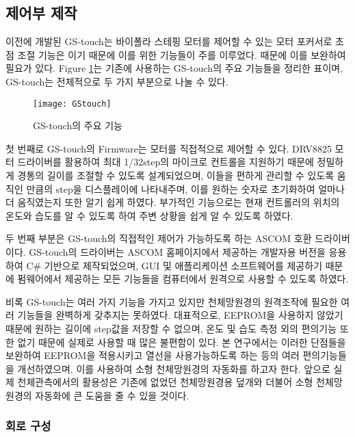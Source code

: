 \newpage
\subsection{제어부 제작}


이전에 개발된 GS-touch는 바이폴라 스테핑 모터를 제어할 수 있는 모터 포커서로 초점 조절 기능은 이기 때문에 이를 위한 기능들이 주를 이루었다. 때문에 이를 보완하여 필요가 있다. \textrm{Figure} \ref{GStocuh}는 기존에 사용하는 GS-touch의 주요 기능들을 정리한 표이며, GS-touch는 전체적으로 두 가지 부분으로 나눌 수 있다.

\bigskip
\begin{figure}[h]
	\begin{center}
		\texttt{[image: GStouch]}
	\end{center}
	\caption{GS-touch의 주요 기능}
	\label{GStocuh}
\end{figure}

첫 번째로 GS-touch의 Firmware는 모터를 직접적으로 제어할 수 있다. DRV8825 모터 드라이버를 활용하여 최대 1/32step의 마이크로 컨트롤을 지원하기 때문에 정밀하게 경통의 길이를 조절할 수 있도록 설계되었으며, 이들을 편하게 관리할 수 있도록 움직인 만큼의 step을 디스플레이에 나타내주며, 이를 원하는 숫자로 초기화하여 얼마나 더 움직였는지 또한 알기 쉽게 하였다. 부가적인 기능으로는 현재 컨트롤러의 위치의 온도와 습도를 알 수 있도록 하여 주변 상황을 쉽게 알 수 있도록 하였다.

두 번째 부분은 GS-touch의 직접적인 제어가 가능하도록 하는 ASCOM 호환 드라이버이다. GS-touch의 드라이버는 ASCOM 홈페이지에서 제공하는 개발자용 버전을 응용하여 C\# 기반으로 제작되었으며, GUI 및 애플리케이션 소프트웨어를 제공하기 때문에 펌웨어에서 제공하는 모든 기능들을 컴퓨터에서 원격으로 사용할 수 있도록 하였다.

비록 GS-touch는 여러 가지 기능을 가지고 있지만 천체망원경의 원격조작에 필요한 여러 기능들을 완벽하게 갖추지는 못하였다. 대표적으로, EEPROM을 사용하지 않았기 때문에 원하는 길이에 step값을 저장할 수 없으며, 온도 및 습도 측정 외의 편의기능 또한 없기 때문에 실제로 사용할 때 많은 불편함이 있다. 본 연구에서는 이러한 단점들을 보완하여 EEPROM을 적용시키고 열선을 사용가능하도록 하는 등의 여러 편의기능들을 개선하였으며, 이를 사용하여 소형 천체망원경의 자동화를 하고자 한다. 앞으로 실제 천체관측에서의 활용성은 기존에 없었던 천체망원경용 덮개와 더불어 소형 천체망원경의 자동화에 큰 도움을 줄 수 있을 것이다.

\subsubsection{회로 구성}

